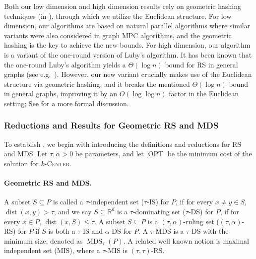 \documentclass[11pt,letterpaper]{article}
\theoremstyle{plain}
\theoremstyle{definition}
\theoremstyle{remark}
\newcommand{\ProblemName}[1]{\textsc{#1}}
\newcommand{\kCenter}{$k$-\ProblemName{Center}\xspace}
\DeclareMathOperator{\OPT}{OPT}
\DeclareMathOperator{\dist}{dist}
\DeclareMathOperator{\MDS}{MDS}
\begin{document}
Both our low dimension and high dimension results rely on geometric hashing techniques (in ),
through which we utilize the Euclidean structure.
For low dimension, our algorithms are based on natural parallel algorithms where similar variants were also considered in graph MPC algorithms,
and the geometric hashing is the key to achieve the new bounds. 
For high dimension, our algorithm is a variant of the one-round version of Luby's algorithm. 
It has been known that the one-round Luby's algorithm yields a $\Theta(\log n)$ bound for RS in general graphs (see e.g.~\cite[Exercise 1.12]{dist_graph_book}). 
However, our new variant crucially makes use of the Euclidean structure via geometric hashing,
and it breaks the mentioned $\Theta(\log n)$ bound
in general graphs, improving it by an $O(\log\log n)$ factor in the Euclidean setting;
See  for a more formal discussion.


\subsubsection{Reductions and Results for Geometric RS and MDS}
\label{subsec:intro_reductions}
To establish ,
we begin with introducing the definitions and reductions for RS and MDS.
Let $\tau, \alpha>0$ be parameters, and let $\OPT$ be the minimum cost of the solution for \kCenter.



\paragraph{Geometric RS and MDS.}
A subset $S\subseteq P$ is called a $\tau$-independent set ($\tau$-IS) for $P$, if for every $x\neq y\in S$, $\dist(x, y)>\tau$,
and we say $S \subseteq \mathbb{R}^d$ is a $\tau$-dominating set ($\tau$-DS) for $P$,
if for every $x \in P$, $\dist(x, S) \leq \tau$.
A subset $S \subseteq P$ is a $(\tau, \alpha)$-ruling set ($(\tau, \alpha)$-RS) for $P$ if $S$ is both a $\tau$-IS and $\alpha$-DS for $P$.
A $\tau$-MDS is a $\tau$-DS with the minimum size, denoted as $\MDS_\tau(P)$.
A related well known notion is maximal independent set (MIS), where a $\tau$-MIS is $(\tau, \tau)$-RS.
\end{document}
